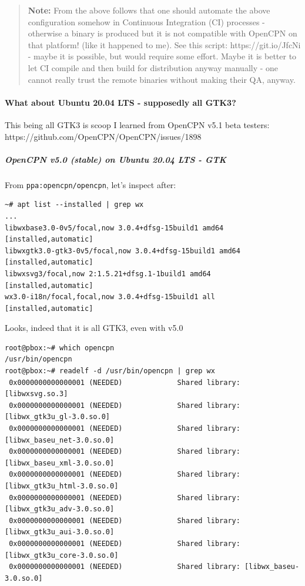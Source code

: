 \documentclass[11pt]{article}
\begin{document}
    \begin{quote}
\textbf{Note:} From the above follows that one should automate the above
configuration somehow in Continuous Integration (CI) processes -
otherwise a binary is produced but it is not compatible with OpenCPN on
that platform! (like it happened to me). See this script:
https://git.io/JfcNi - maybe it is possible, but would require some
effort. Maybe it is better to let CI compile and then build for
distribution anyway manually - one cannot really trust the remote
binaries without making their QA, anyway.
\end{quote}

    \hypertarget{what-about-ubuntu-20.04-lts---supposedly-all-gtk3}{%
\paragraph{What about Ubuntu 20.04 LTS - supposedly all
GTK3?}\label{what-about-ubuntu-20.04-lts---supposedly-all-gtk3}}

    This being all GTK3 is scoop I learned from OpenCPN v5.1 beta testers:
https://github.com/OpenCPN/OpenCPN/issues/1898

    \hypertarget{opencpn-v5.0-stable-on-ubuntu-20.04-lts---gtk}{%
\subparagraph{OpenCPN v5.0 (stable) on Ubuntu 20.04 LTS -
GTK}\label{opencpn-v5.0-stable-on-ubuntu-20.04-lts---gtk}}

    From \texttt{ppa:opencpn/opencpn}, let's inspect after:

    \begin{verbatim}
~# apt list --installed | grep wx
...
libwxbase3.0-0v5/focal,now 3.0.4+dfsg-15build1 amd64 [installed,automatic]
libwxgtk3.0-gtk3-0v5/focal,now 3.0.4+dfsg-15build1 amd64 [installed,automatic]
libwxsvg3/focal,now 2:1.5.21+dfsg.1-1build1 amd64 [installed,automatic]
wx3.0-i18n/focal,focal,now 3.0.4+dfsg-15build1 all [installed,automatic]
\end{verbatim}

    Looks, indeed that it is all GTK3, even with v5.0

    \begin{verbatim}
root@pbox:~# which opencpn
/usr/bin/opencpn
root@pbox:~# readelf -d /usr/bin/opencpn | grep wx
 0x0000000000000001 (NEEDED)             Shared library: [libwxsvg.so.3]
 0x0000000000000001 (NEEDED)             Shared library: [libwx_gtk3u_gl-3.0.so.0]
 0x0000000000000001 (NEEDED)             Shared library: [libwx_baseu_net-3.0.so.0]
 0x0000000000000001 (NEEDED)             Shared library: [libwx_baseu_xml-3.0.so.0]
 0x0000000000000001 (NEEDED)             Shared library: [libwx_gtk3u_html-3.0.so.0]
 0x0000000000000001 (NEEDED)             Shared library: [libwx_gtk3u_adv-3.0.so.0]
 0x0000000000000001 (NEEDED)             Shared library: [libwx_gtk3u_aui-3.0.so.0]
 0x0000000000000001 (NEEDED)             Shared library: [libwx_gtk3u_core-3.0.so.0]
 0x0000000000000001 (NEEDED)             Shared library: [libwx_baseu-3.0.so.0]
\end{verbatim}
\end{document}
